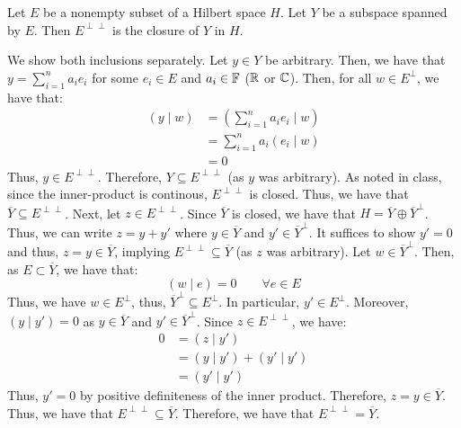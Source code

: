 \documentclass[12pt]{article}
\begin{document}
\begin{problem}{59}
    Let $E$ be a nonempty subset of a Hilbert space $H$. Let $Y$ be a subspace spanned by $E$. Then $E^{\perp\perp}$ is the closure of $Y$ in $H$.
\end{problem}
\begin{solution}
    We show both inclusions separately. \bbni
    Let $y \in Y$ be arbitrary. Then, we have that $y = \sum_{i=1}^n a_i e_i$ for some $e_i \in E$ and $a_i \in \mathbb F$ ($\mathbb R$ or $\mathbb C$). Then, for all $w \in E^\perp$, we have that: 
    \begin{align*}
        (y \mid w) &= \left(\sum_{i=1}^n a_i e_i \mid w\right) \\
        &= \sum_{i=1}^n a_i (e_i \mid w) \\
        &= 0
    \end{align*}
    Thus, $y \in E^{\perp\perp}$. Therefore, $Y \subseteq E^{\perp\perp}$ (as $y$ was arbitrary). As noted in class, since the inner-product is continous, $E^{\perp\perp}$ is closed. Thus, we have that $\overline{Y} \subseteq E^{\perp\perp}$. \bbni
    Next, let $z \in E^{\perp\perp}$. Since $\overline{Y}$ is closed, we have that $H = \overline{Y} \oplus \overline{Y}^\perp$. Thus, we can write $z = y + y'$ where $y \in \overline{Y}$ and $y' \in \overline{Y}^\perp$. It suffices to show $y' = 0$ and thus, $z = y \in \overline{Y}$, implying $E^{\perp\perp} \subseteq \overline{Y}$ (as $z$ was arbitrary). \bbni
    Let $w \in \overline{Y}^\perp$. Then, as $E \subset \overline{Y}$, we have that:
    \[ (w \mid e) = 0 \qquad \forall e \in E\] 
    Thus, we have $w \in E^\perp$, thus, $\overline{Y}^\perp \subseteq E^\perp$. In particular, $y' \in E^\perp$. Moreover, $(y \mid y') = 0$ as $y \in \overline{Y}$ and $y' \in \overline{Y}^\perp$. Since $z \in E^{\perp\perp}$, we have:
    \begin{align*}
        0 &= (z \mid y') \\
        &= (y \mid y') + (y' \mid y') \\
        &= (y' \mid y')
    \end{align*} 
    Thus, $y' = 0$ by positive definiteness of the inner product. Therefore, $z = y \in \overline{Y}$. Thus, we have that $E^{\perp\perp} \subseteq \overline{Y}$. \bbni
    Therefore, we have that $E^{\perp\perp} = \overline{Y}$.
\end{solution}
\newpage
\end{document}
